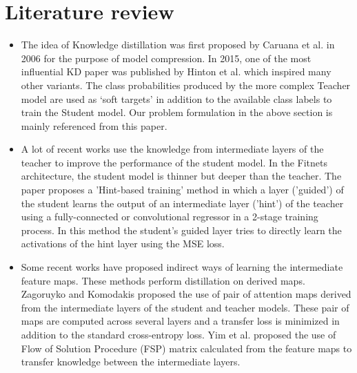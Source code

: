 \documentclass{article} %
\begin{document}
	\section{Literature review}
	\begin{itemize}
		\item The idea of Knowledge distillation was first proposed by Caruana et al. \cite{10.1145/1150402.1150464} in 2006 for the purpose of model compression. In 2015, one of the most influential KD paper was published by Hinton et al. \cite{hinton2015distilling} which inspired many other variants. The class probabilities produced by the more complex Teacher model are used as ‘soft targets’ in addition to the available class labels to train the Student model. 
		Our problem formulation in the above section is mainly referenced from this paper.
		
		\item A lot of recent works use the knowledge from intermediate layers of the teacher to improve the performance of the student model. 
		In the Fitnets \cite{fitnets} architecture, the student model is thinner but deeper than the teacher. The paper proposes a 'Hint-based training' method in which a layer ('guided') of the student learns the output of an intermediate layer ('hint') of the teacher using a fully-connected or convolutional regressor in a 2-stage training process. In this method the student's guided layer tries to directly learn the activations of the hint layer using the MSE loss. 
		
		\item Some recent works have proposed indirect ways of learning the intermediate feature maps. These methods perform distillation on derived maps. Zagoruyko and Komodakis \cite{attention} proposed the use of pair of attention maps derived from the intermediate layers of the student and teacher models. These pair of maps are computed across several layers and a transfer loss is minimized in addition to the standard cross-entropy loss. 
		Yim et al. \cite{yim2017gift} proposed the use of Flow of Solution Procedure (FSP) matrix calculated from the feature maps to transfer knowledge between the intermediate layers. 
		

\end{itemize}
\end{document}

